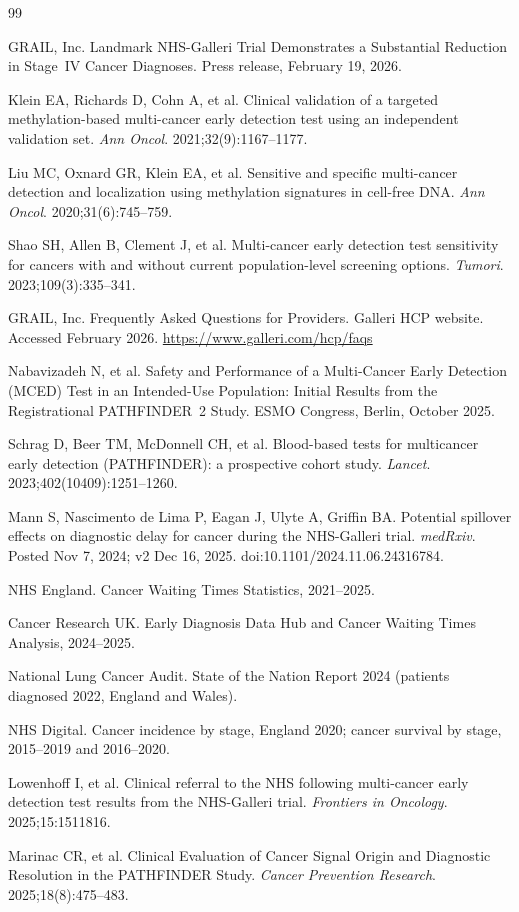 \documentclass[11pt,letter]{article}
\begin{document}
\begin{thebibliography}{99}

GRAIL, Inc. Landmark NHS-Galleri Trial Demonstrates a Substantial Reduction
in Stage~IV Cancer Diagnoses. Press release, February 19, 2026.

Klein EA, Richards D, Cohn A, et al. Clinical validation of a targeted
methylation-based multi-cancer early detection test using an independent
validation set. \textit{Ann Oncol}. 2021;32(9):1167--1177.

Liu MC, Oxnard GR, Klein EA, et al. Sensitive and specific multi-cancer
detection and localization using methylation signatures in cell-free DNA.
\textit{Ann Oncol}. 2020;31(6):745--759.

Shao SH, Allen B, Clement J, et al. Multi-cancer early detection test
sensitivity for cancers with and without current population-level screening
options. \textit{Tumori}. 2023;109(3):335--341.

GRAIL, Inc. Frequently Asked Questions for Providers. Galleri HCP website.
Accessed February 2026.
\url{https://www.galleri.com/hcp/faqs}

Nabavizadeh N, et al. Safety and Performance of a Multi-Cancer Early
Detection (MCED) Test in an Intended-Use Population: Initial Results from
the Registrational PATHFINDER~2 Study. ESMO Congress, Berlin, October 2025.

Schrag D, Beer TM, McDonnell CH, et al. Blood-based tests for multicancer
early detection (PATHFINDER): a prospective cohort study. \textit{Lancet}.
2023;402(10409):1251--1260.

Mann S, Nascimento de Lima P, Eagan J, Ulyte A, Griffin BA. Potential
spillover effects on diagnostic delay for cancer during the NHS-Galleri
trial. \textit{medRxiv}. Posted Nov 7, 2024; v2 Dec 16, 2025.
doi:10.1101/2024.11.06.24316784.

NHS England. Cancer Waiting Times Statistics, 2021--2025.

Cancer Research UK. Early Diagnosis Data Hub and Cancer Waiting Times
Analysis, 2024--2025.

National Lung Cancer Audit. State of the Nation Report 2024 (patients
diagnosed 2022, England and Wales).

NHS Digital. Cancer incidence by stage, England 2020; cancer survival by
stage, 2015--2019 and 2016--2020.

Lowenhoff I, et al. Clinical referral to the NHS following multi-cancer
early detection test results from the NHS-Galleri trial. \textit{Frontiers
in Oncology}. 2025;15:1511816.

Marinac CR, et al. Clinical Evaluation of Cancer Signal Origin and
Diagnostic Resolution in the PATHFINDER Study. \textit{Cancer Prevention
Research}. 2025;18(8):475--483.

\end{thebibliography}
\end{document}

